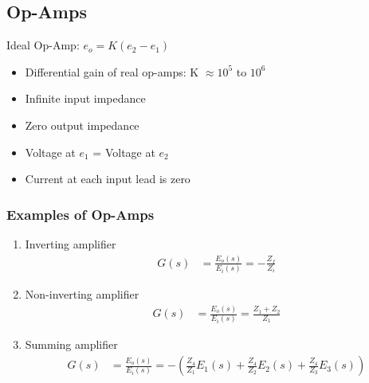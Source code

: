 \documentclass[a4paper]{article}
\begin{document}
\subsection{Op-Amps}
\begin{center}
    Ideal Op-Amp: $e_o = K(e_2-e_1)$
\end{center}
\begin{itemize}
    \item Differential gain of real op-amps: K $\approx 10^5$ to $10^6$
    \item Infinite input impedance
    \item Zero output impedance
    \item Voltage at $e_1$ = Voltage at $e_2$
    \item Current at each input lead is zero
\end{itemize}
\subsubsection{Examples of Op-Amps}
\begin{enumerate}[label=\alph*.]
    \item Inverting amplifier
    \begin{align*}
        G(s) &= \frac{E_o(s)}{E_i(s)} = -\frac{Z_f}{Z_i}
    \end{align*}
    \item Non-inverting amplifier
    \begin{align*}
        G(s) &= \frac{E_o(s)}{E_i(s)} = \frac{Z_1+Z_2}{Z_1}
    \end{align*}
    \item Summing amplifier
    \begin{align*}
        G(s) &= \frac{E_o(s)}{E_i(s)} = -\left(\frac{Z_4}{Z_1}E_1(s)+\frac{Z_4}{Z_2}E_2(s)+\frac{Z_4}{Z_3}E_3(s)\right)
    \end{align*}
\end{enumerate}
\end{document}
